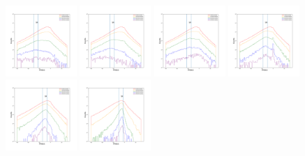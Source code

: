 \documentclass[12pt,prd]{article}
\begin{document}
\begin{figure}[h!]
\includegraphics[width=0.24\textwidth]{../figures/scanning_plotsgaiascan_l67_5_b74_4_ra208_6_dec35_1_npy_6.pdf}
\includegraphics[width=0.24\textwidth]{../figures/scanning_plotsgaiascan_l67_5_b74_4_ra208_6_dec35_1_npy_7.pdf}
\includegraphics[width=0.24\textwidth]{../figures/scanning_plotsgaiascan_l67_5_b74_4_ra208_6_dec35_1_npy_8.pdf}
\includegraphics[width=0.24\textwidth]{../figures/scanning_plotsgaiascan_l67_5_b74_4_ra208_6_dec35_1_npy_9.pdf}
\includegraphics[width=0.24\textwidth]{../figures/scanning_plotsgaiascan_l67_5_b74_4_ra208_6_dec35_1_npy_10.pdf}
\includegraphics[width=0.24\textwidth]{../figures/scanning_plotsgaiascan_l67_5_b74_4_ra208_6_dec35_1_npy_11.pdf}

\end{figure}
\end{document}
